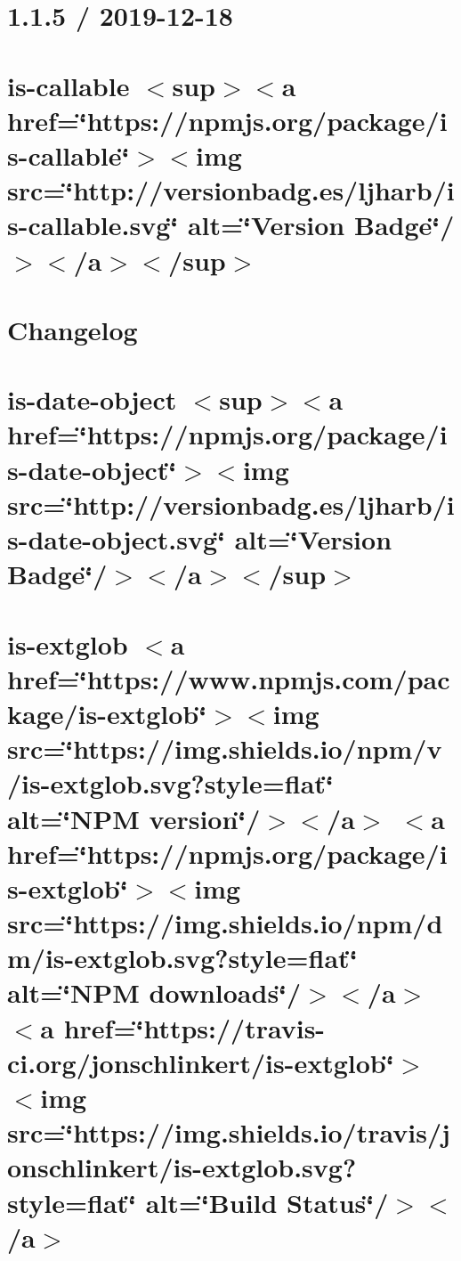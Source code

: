 \let\mypdfximage\pdfximage\def\pdfximage{\immediate\mypdfximage}\documentclass[twoside]{book}
\newcommand{\+}{\discretionary{\mbox{\scriptsize$\hookleftarrow$}}{}{}}
\begin{document}
\chapter{1.1.5 / 2019-\/12-\/18}
\label{md_heap-visualizer_node_modules_is-callable__c_h_a_n_g_e_l_o_g}

\chapter{is-\/callable $<$sup$>$$<$a href=\char`\"{}https\+://npmjs.\+org/package/is-\/callable\char`\"{}$>$$<$img src=\char`\"{}http\+://versionbadg.\+es/ljharb/is-\/callable.\+svg\char`\"{} alt=\char`\"{}\+Version Badge\char`\"{}/$>$$<$/a$>$$<$/sup$>$}
\label{md_heap-visualizer_node_modules_is-callable__r_e_a_d_m_e}

\chapter{Changelog}
\label{md_heap-visualizer_node_modules_is-date-object__c_h_a_n_g_e_l_o_g}

\chapter{is-\/date-\/object $<$sup$>$$<$a href=\char`\"{}https\+://npmjs.\+org/package/is-\/date-\/object\char`\"{}$>$$<$img src=\char`\"{}http\+://versionbadg.\+es/ljharb/is-\/date-\/object.\+svg\char`\"{} alt=\char`\"{}\+Version Badge\char`\"{}/$>$$<$/a$>$$<$/sup$>$}
\label{md_heap-visualizer_node_modules_is-date-object__r_e_a_d_m_e}

\chapter{is-\/extglob $<$a href=\char`\"{}https\+://www.\+npmjs.\+com/package/is-\/extglob\char`\"{}$>$$<$img src=\char`\"{}https\+://img.\+shields.\+io/npm/v/is-\/extglob.\+svg?style=flat\char`\"{} alt=\char`\"{}\+N\+P\+M version\char`\"{}/$>$$<$/a$>$ $<$a href=\char`\"{}https\+://npmjs.\+org/package/is-\/extglob\char`\"{}$>$$<$img src=\char`\"{}https\+://img.\+shields.\+io/npm/dm/is-\/extglob.\+svg?style=flat\char`\"{} alt=\char`\"{}\+N\+P\+M downloads\char`\"{}/$>$$<$/a$>$ $<$a href=\char`\"{}https\+://travis-\/ci.\+org/jonschlinkert/is-\/extglob\char`\"{}$>$$<$img src=\char`\"{}https\+://img.\+shields.\+io/travis/jonschlinkert/is-\/extglob.\+svg?style=flat\char`\"{} alt=\char`\"{}\+Build Status\char`\"{}/$>$$<$/a$>$}
\label{md_heap-visualizer_node_modules_is-extglob__r_e_a_d_m_e}

\end{document}
